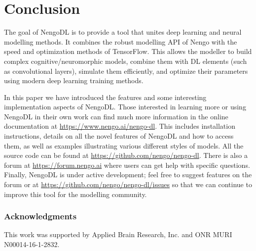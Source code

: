 \documentclass{article}
\begin{document}
\section{Conclusion}

The goal of NengoDL is to provide a tool that unites deep learning and neural modelling methods.  It combines the robust modelling API of Nengo with the speed and optimization methods of TensorFlow.  This allows the modeller to build complex cognitive/neuromorphic models, combine them with DL elements (such as convolutional layers), simulate them efficiently, and optimize their parameters using modern deep learning training methods.

In this paper we have introduced the features and some interesting implementation aspects of NengoDL.  Those interested in learning more or using NengoDL in their own work can find much more information in the online documentation at \url{https://www.nengo.ai/nengo-dl}.  This includes installation instructions, details on all the novel features of NengoDL and how to access them, as well as examples illustrating various different styles of models.  All the source code can be found at \url{https://github.com/nengo/nengo-dl}.  There is also a forum at \url{https://forum.nengo.ai} where users can get help with specific questions.  Finally, NengoDL is under active development; feel free to suggest features on the forum or at \url{https://github.com/nengo/nengo-dl/issues} so that we can continue to improve this tool for the modelling community.

\subsubsection*{Acknowledgments}

This work was supported by Applied Brain Research, Inc. and ONR MURI N00014-16-1-2832.

\small



\end{document}
